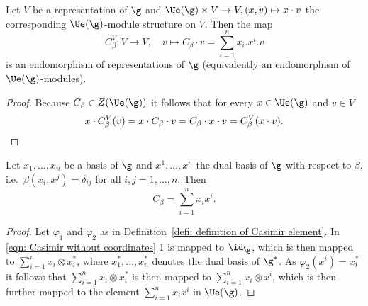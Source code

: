 \begin{corollary}\label{cor: Casimir homomorphism of a representation}
 Let $V$ be a representation of $\g$ and $\Ue(\g) \times V \to V, (x,v) \mapsto x \cdot v$ the corresponding $\Ue(\g)$-module structure on $V$. Then the map
 \[
  C_\beta^V \colon V \to V, \quad v \mapsto C_\beta \cdot v = \sum_{i=1}^n x_i.x^i.v
 \]
 is an endomorphism of representations of $\g$ (equivalently an endomorphism of $\Ue(\g)$-modules).
\end{corollary}
\begin{proof}
 Because $C_\beta \in Z(\Ue(\g))$ it follows that for every $x \in \Ue(\g)$ and $v \in V$
 \[
  x \cdot C_\beta^V(v)
  = x \cdot C_\beta \cdot v
  = C_\beta \cdot x \cdot v
  = C_\beta^V(x \cdot v).
  \qedhere
 \]
\end{proof}


\begin{lemma} \label{lem: casimir in coordinates}
 Let $x_1, \dotsc, x_n$ be a basis of $\g$ and $x^1, \dotsc, x^n$ the dual basis of $\g$ with respect to $\beta$, i.e.\ $\beta(x_i, x^j) = \delta_{ij}$ for all $i,j = 1, \dotsc, n$. Then
 \[
  C_\beta = \sum_{i=1}^n x_i x^i.
 \]
\end{lemma}
\begin{proof}
 Let $\varphi_1$ and $\varphi_2$ as in Definition~\ref{defi: definition of Casimir element}. In \eqref{eqn: Casimir without coordinates} $1$ is mapped to $\id_\g$, which is then mapped to $\sum_{i=1}^n x_i \otimes x_i^*$, where $x_1^*, \dotsc, x_n^*$ denotes the dual basis of $\g^*$. As $\varphi_2(x^i) = x_i^*$ it follows that $\sum_{i=1}^n x_i \otimes x_i^*$ is then mapped to $\sum_{i=1}^n x_i \otimes x^i$, which is then further mapped to the element $\sum_{i=1}^n x_i x^i$ in $\Ue(\g)$.
\end{proof}


